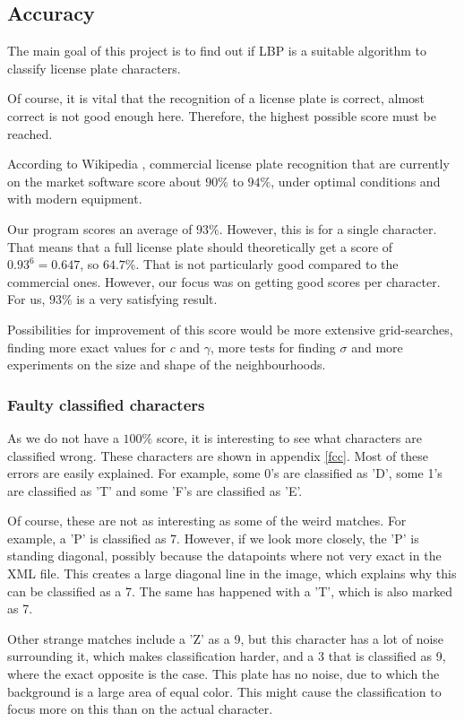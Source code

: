 \documentclass[a4paper]{article}
\begin{document}
\subsection{Accuracy}

The main goal of this project is to find out if LBP is a suitable algorithm to
classify license plate characters.

Of course, it is vital that the recognition of a license plate is correct,
almost correct is not good enough here. Therefore, the highest possible score
must be reached.

According to Wikipedia \cite{wikiplate}, commercial license plate recognition
that are currently on the market software score about $90\%$ to $94\%$, under
optimal conditions and with modern equipment.

Our program scores an average of $93\%$. However, this is for a single
character. That means that a full license plate should theoretically
get a score of $0.93^6 = 0.647$, so $64.7\%$. That is not particularly
good compared to the commercial ones. However, our focus was on getting
good scores per character. For us, $93\%$ is a very satisfying result.

Possibilities for improvement of this score would be more extensive
grid-searches, finding more exact values for $c$ and $\gamma$, more tests
for finding $\sigma$ and more experiments on the size and shape of the
neighbourhoods.

\subsubsection*{Faulty classified characters}

As we do not have a $100\%$ score, it is interesting to see what characters are
classified wrong. These characters are shown in appendix \ref{fcc}. Most of
these errors are easily explained. For example, some 0's are classified as
'D', some 1's are classified as 'T' and some 'F's are classified as 'E'.

Of course, these are not as interesting as some of the weird matches. For
example, a 'P' is classified as 7. However, if we look more closely, the 'P' is
standing diagonal, possibly because the datapoints where not very exact in the
XML file. This creates a large diagonal line in the image, which explains why
this can be classified as a 7. The same has happened with a 'T', which is also
marked as 7.

Other strange matches include a 'Z' as a 9, but this character has a lot of
noise surrounding it, which makes classification harder, and a 3 that is
classified as 9, where the exact opposite is the case. This plate has no noise,
due to which the background is a large area of equal color. This might cause
the classification to focus more on this than on the actual character.
\end{document}
